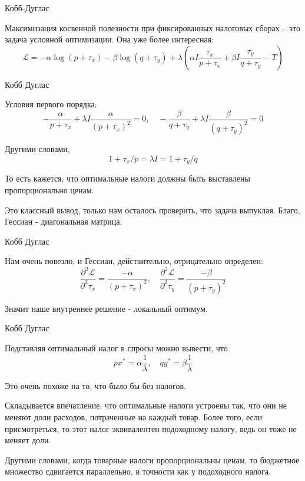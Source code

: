 \documentclass{beamer}
\begin{document}
\begin{frame}{Кобб-Дуглас}

Максимизация косвенной полезности при фиксированных налоговых сборах – это задача условной оптимизации. Она уже более интересная:
$$\mathcal{L} = - \alpha \log(p + \tau_x) - \beta \log (q + \tau_y) + \lambda (\alpha I \frac{\tau_x}{p+\tau_x} + \beta I \frac{\tau_y}{q+\tau_y} - T)$$

\end{frame}

\begin{frame}{Кобб Дуглас}

Условия первого порядка:
$$ - \frac{\alpha}{p + \tau_x} + \lambda I \frac{\alpha}{(p + \tau_x)^2} = 0, \quad - \frac{\beta}{q + \tau_y} + \lambda I \frac{\beta}{(q + \tau_y)^2} = 0$$

Другими словами,
$$1 + \tau_x / p = \lambda I = 1 + \tau_y / q$$

То есть кажется, что оптимальные налоги должны быть выставлены пропорционально ценам. 

Это классный вывод, только нам осталось проверить, что задача выпуклая. Благо, Гессиан - диагональная матрица.

\end{frame}

\begin{frame}{Кобб Дуглас}

Нам очень повезло, и Гессиан, действительно, отрицательно определен:
$$ \frac{\partial^2 \mathcal{L}}{\partial^2 \tau_x} = \frac{-\alpha}{(p+\tau_x)^2}, \quad \frac{\partial^2 \mathcal{L}}{\partial^2 \tau_y} = \frac{-\beta}{(p+\tau_y)^2}$$

Значит наше внутреннее решение - локальный оптимум.

\end{frame}

\begin{frame}{Кобб Дуглас}

Подставляя оптимальный налог в спросы можно вывести, что
$$ p x^{\ast} = \alpha \frac{1}{\lambda}, \quad q y^{\ast} = \beta \frac{1}{\lambda}$$

Это очень похоже на то, что было бы без налогов. 

Складывается впечатление, что оптимальные налоги устроены так, что они не меняют доли расходов, потраченные на каждый товар. Более того, если присмотреться, то этот налог эквивалентен подоходному налогу, ведь он тоже не меняет доли. 

Другими словами, когда товарные налоги пропорциональны ценам, то бюджетное множество сдвигается параллельно, в точности как у подоходного налога.

\end{frame}
\end{document}
